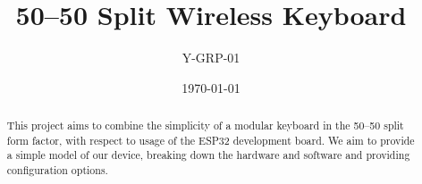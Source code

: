 \documentclass{report}
\begin{document}
\title{50--50 Split Wireless Keyboard}
\author{Y-GRP-01}
\date{\today}
\maketitle

\begin{abstract}
This project aims to combine the simplicity of a modular keyboard in the 50--50 split form factor, with respect to usage of the ESP32 development board. We aim to provide a simple model of our device, breaking down the hardware and software and providing configuration options.
\end{abstract}
\end{document}
